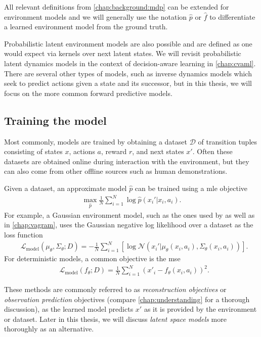 All relevant definitions from \autoref{chap:background:mdp} can be extended for environment models and we will generally use the notation $\hat{p}$ or $\hat{f}$ to differentiate a learned environment model from the ground truth.

Probabilistic latent environment models are also possible and are defined as one would expect via kernels over next latent states.
We will revisit probabilistic latent dynamics models in the context of decision-aware learning in \autoref{chap:cvaml}.
There are several other types of models, such as inverse dynamics models which seek to predict actions given a state and its successor, but in this thesis, we will focus on the more common forward predictive models.

\subsection{Training the model}

Most commonly, models are trained by obtaining a dataset $\mathcal{D}$ of transition tuples consisting of states $x$, actions $a$, reward $r$, and next states $x'$. 
Often these datasets are obtained online during interaction with the environment, but they can also come from other offline sources such as human demonstrations.

Given a dataset, an approximate model $\hat{p}$ can be trained using a \ac{mle} objective 
\begin{align}
\max_{\hat{p}} \frac{1}{N}\sum_{i=1}^N \log \hat{p}(x_i'|x_i,a_i).
\end{align}
For example, a Gaussian environment model, such as the ones used by \textcite{pets,janner2019mbpo} as well as in \autoref{chap:vagram}, uses the Gaussian negative log likelihood over a dataset as the loss function
\begin{align}
    &\mathcal{L}_\mathrm{model}(\mu_\theta, \Sigma_\theta; D) = - \frac{1}{N} \sum_{i=1}^N \left[\log \mathcal{N}(x_i' | \mu_\theta(x_i,a_i), \Sigma_\theta(x_i, a_i)) \right].
\end{align}
For deterministic models, a common objective is the \ac{mse}
\begin{align}
    &\mathcal{L}_\mathrm{model}(f_\theta; D) = \frac{1}{N} \sum_{i=1}^N (x'_i - f_\theta(x_i, a_i))^2.
\end{align}

These methods are commonly referred to as \emph{reconstruction objectives} or \emph{observation prediction} objectives (compare \autoref{chap:understanding} for a thorough discussion), as the learned model predicts $x'$ as it is provided by the environment or dataset.
Later in this thesis, we will discuss \emph{latent space models} more thoroughly as an alternative.

